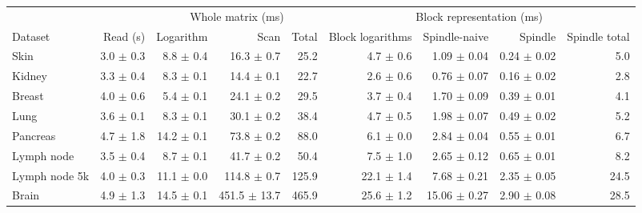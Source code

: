 \begin{tabular}{lrrrrrrrr}
\toprule
 &  & \multicolumn{3}{c}{Whole matrix (ms)} & \multicolumn{4}{c}{Block representation (ms)} \\
\cmidrule(lr){3-5} \cmidrule(lr){6-9}
Dataset & Read (s) & Logarithm & Scan & Total & Block logarithms & Spindle-naive & Spindle & Spindle total \\
\midrule
Skin & 3.0 $\pm$ 0.3 & 8.8 $\pm$ 0.4 & 16.3 $\pm$ 0.7 & 25.2 & 4.7 $\pm$ 0.6 & 1.09 $\pm$ 0.04 & 0.24 $\pm$ 0.02 & 5.0 \\
Kidney & 3.3 $\pm$ 0.4 & 8.3 $\pm$ 0.1 & 14.4 $\pm$ 0.1 & 22.7 & 2.6 $\pm$ 0.6 & 0.76 $\pm$ 0.07 & 0.16 $\pm$ 0.02 & 2.8 \\
Breast & 4.0 $\pm$ 0.6 & 5.4 $\pm$ 0.1 & 24.1 $\pm$ 0.2 & 29.5 & 3.7 $\pm$ 0.4 & 1.70 $\pm$ 0.09 & 0.39 $\pm$ 0.01 & 4.1 \\
Lung & 3.6 $\pm$ 0.1 & 8.3 $\pm$ 0.1 & 30.1 $\pm$ 0.2 & 38.4 & 4.7 $\pm$ 0.5 & 1.98 $\pm$ 0.07 & 0.49 $\pm$ 0.02 & 5.2 \\
Pancreas & 4.7 $\pm$ 1.8 & 14.2 $\pm$ 0.1 & 73.8 $\pm$ 0.2 & 88.0 & 6.1 $\pm$ 0.0 & 2.84 $\pm$ 0.04 & 0.55 $\pm$ 0.01 & 6.7 \\
Lymph node & 3.5 $\pm$ 0.4 & 8.7 $\pm$ 0.1 & 41.7 $\pm$ 0.2 & 50.4 & 7.5 $\pm$ 1.0 & 2.65 $\pm$ 0.12 & 0.65 $\pm$ 0.01 & 8.2 \\
Lymph node 5k & 4.0 $\pm$ 0.3 & 11.1 $\pm$ 0.0 & 114.8 $\pm$ 0.7 & 125.9 & 22.1 $\pm$ 1.4 & 7.68 $\pm$ 0.21 & 2.35 $\pm$ 0.05 & 24.5 \\
Brain & 4.9 $\pm$ 1.3 & 14.5 $\pm$ 0.1 & 451.5 $\pm$ 13.7 & 465.9 & 25.6 $\pm$ 1.2 & 15.06 $\pm$ 0.27 & 2.90 $\pm$ 0.08 & 28.5 \\
\bottomrule
\end{tabular}
